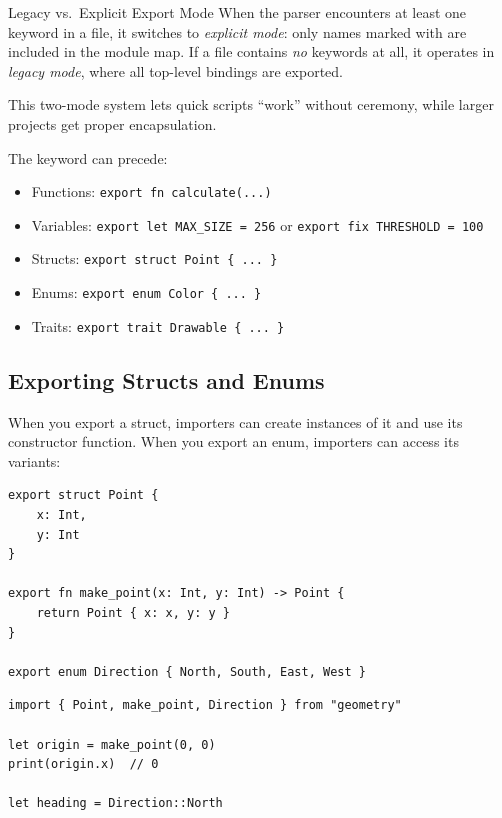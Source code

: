 \begin{defnbox}{Legacy vs.\ Explicit Export Mode}
When the parser encounters at least one  keyword in a file, it switches to \emph{explicit mode}: only names marked with  are included in the module map.
If a file contains \emph{no}  keywords at all, it operates in \emph{legacy mode}, where all top-level bindings are exported.

This two-mode system lets quick scripts ``work'' without ceremony, while larger projects get proper encapsulation.
\end{defnbox}

The  keyword can precede:

\begin{itemize}[nosep]
  \item Functions: \lstinline|export fn calculate(...)|
  \item Variables: \lstinline|export let MAX_SIZE = 256| or \lstinline|export fix THRESHOLD = 100|
  \item Structs: \lstinline|export struct Point { ... }|
  \item Enums: \lstinline|export enum Color { ... }|
  \item Traits: \lstinline|export trait Drawable { ... }|
\end{itemize}

\subsection{Exporting Structs and Enums}\label{subsec:export-structs-enums}

When you export a struct, importers can create instances of it and use its constructor function.
When you export an enum, importers can access its variants:

\begin{lstlisting}[language=Lattice, caption={geometry.lat --- exporting structs and enums}]
export struct Point {
    x: Int,
    y: Int
}

export fn make_point(x: Int, y: Int) -> Point {
    return Point { x: x, y: y }
}

export enum Direction { North, South, East, West }
\end{lstlisting}

\begin{lstlisting}[language=Lattice, caption={Using exported structs and enums}]
import { Point, make_point, Direction } from "geometry"

let origin = make_point(0, 0)
print(origin.x)  // 0

let heading = Direction::North
\end{lstlisting}

